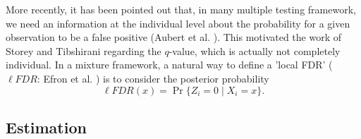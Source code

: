 \documentclass[10pt]{article}
\newcommand{\lFDR}{\ell FDR}
\begin{document}

More recently, it has been pointed out that, in many multiple testing framework, we need an information at the individual level about the probability for a
given observation to be a false positive (Aubert et al. \cite{ABD04}). This motivated the work of Storey and Tibshirani \cite{StT03} regarding the $q$-value,
which is actually not completely individual. In a mixture framework, a natural way to define a 'local FDR' ($\lFDR$: Efron et al. \cite{ETS01}) is to consider
the posterior probability
$$
\lFDR(x) = \Pr\{Z_i = 0 \;|\; X_i = x\}.
$$

\subsection{Estimation}
\end{document}
